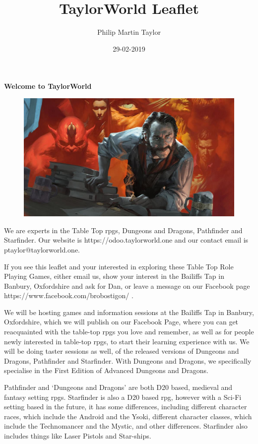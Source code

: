 \documentclass[12pt]{extreport}
\date{29-02-2019}
\author{Philip Martin Taylor}
\title{TaylorWorld Leaflet}
\begin{document}
\begin{center}
\textbf{Welcome to TaylorWorld\texttrademark}
\end{center}
\begin{figure}[h]
  \centering
  \includegraphics[scale=0.15]{alchemist.jpg}
\end{figure}
We are experts in the Table Top \glspl{rpg}, Dungeons and Dragons, Pathfinder and Starfinder. Our website is https://odoo.taylorworld.one and our contact email is ptaylor@taylorworld.one.
 
If you see this leaflet and your interested in exploring these Table Top Role Playing Games, either email us, show your interest in the Bailiffs Tap in Banbury, Oxfordshire and ask for Dan, or leave a message on our Facebook page https://www.facebook.com/brobostigon/ .
 
We will be hosting games and information sessions at the Bailiffs Tap in Banbury, Oxfordshire, which we will publish on our Facebook Page, where you can get reacquainted with the table-top \glspl{rpg} you love and remember, as well as for people newly interested in table-top \glspl{rpg}, to start their learning experience with us. We will be doing taster sessions as well, of the released versions of Dungeons and Dragons, Pathfinder and Starfinder. With Dungeons and Dragons, we specifically specialise in the First Edition of Advanced Dungeons and Dragons.
 
Pathfinder and `Dungeons and Dragons' are both D20 based, medieval and fantasy setting \glspl{rpg}. Starfinder is also a D20 based \gls{rpg}, however with a Sci-Fi setting based in the future, it has some differences, including different character races, which include the Android and the Ysoki, different character classes, which include the Technomancer and the Mystic, and other differences. Starfinder also includes things like Laser Pistols and Star-ships.
 
\end{document}
